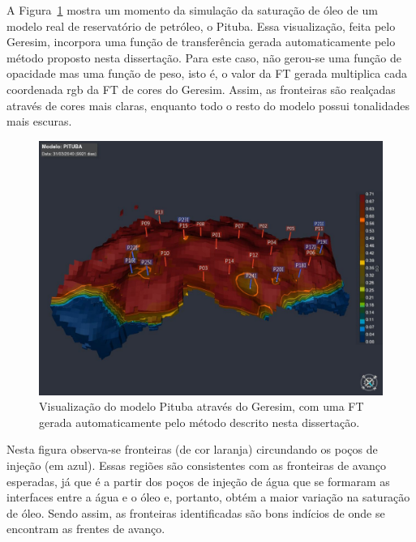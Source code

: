 \clearpage
	A Figura~\ref{fig:r_pituba} mostra um momento da simulação da saturação de óleo de um modelo real de reservatório de petróleo, o Pituba. Essa visualização, feita pelo Geresim, incorpora uma função de transferência gerada automaticamente pelo método proposto nesta dissertação. Para este caso, não gerou-se uma função de opacidade mas uma função de peso, isto é, o valor da FT gerada multiplica cada coordenada rgb da FT de cores do Geresim. Assim, as fronteiras são realçadas através de cores mais claras, enquanto todo o resto do modelo possui tonalidades mais escuras.
	
\begin{figure}[h]
	\centering
	\includegraphics[width=1\textwidth]{images/pituba}
	\caption{Visualização do modelo Pituba através do Geresim, com uma FT gerada automaticamente pelo método descrito nesta dissertação.}
	\label{fig:r_pituba}
\end{figure}
	
	Nesta figura observa-se fronteiras (de cor laranja) circundando os poços de injeção (em azul). Essas regiões são consistentes com as fronteiras de avanço esperadas, já que é a partir dos poços de injeção de água que se formaram as interfaces entre a água e o óleo e, portanto, obtém a maior variação na saturação de óleo. Sendo assim, as fronteiras identificadas são bons indícios de onde se encontram as frentes de avanço.